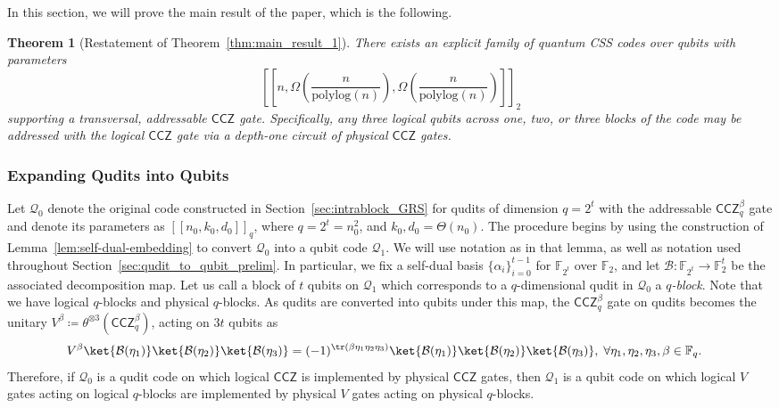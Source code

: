 \documentclass[11pt]{article}
\newtheorem{theorem}{Theorem}[section]
\theoremstyle{definition}
\newcommand{\CCZ}{\mathsf{CCZ}}
\newcommand{\qcode}{\mathcal{Q}}
\newcommand{\FF}{\mathbb{F}}
\newcommand{\B}{\mathcal{B}}
\begin{document}
In this section, we will prove the main result of the paper, which is the following.

\begin{theorem}[Restatement of Theorem~\ref{thm:main_result_1}]\label{thm:main_addressable_CCZ}
    There exists an explicit family of quantum CSS codes over qubits with parameters
    \begin{equation}
        \left[\left[n,\Omega\left(\frac{n}{\text{polylog}(n)}\right),\Omega\left(\frac{n}{\text{polylog}(n)}\right)\right]\right]_2
    \end{equation}
    supporting a transversal, addressable $\CCZ$ gate. Specifically, any three logical qubits across one, two, or three blocks of the code may be addressed with the logical $\CCZ$ gate via a depth-one circuit of physical $\CCZ$ gates.
\end{theorem}


\subsubsection{Expanding Qudits into Qubits}

Let $\qcode_0$ denote the original code constructed in Section~\ref{sec:intrablock_GRS} for qudits of dimension $q=2^t$ with the addressable $\CCZ_q^\beta$ gate and denote its parameters as $[[n_0,k_0,d_0]]_q$, where $q=2^t = n_0^2$, and $k_0,d_0 = \Theta(n_0)$. The procedure begins by using the construction of Lemma~\ref{lem:self-dual-embedding} to convert $\mathcal{Q}_0$ into a qubit code $\mathcal{Q}_1$. We will use notation as in that lemma, as well as notation used throughout Section~\ref{sec:qudit_to_qubit_prelim}. In particular, we fix a self-dual basis $\{\alpha_i\}_{i=0}^{t-1}$ for $\mathbb{F}_{2^t}$ over $\mathbb{F}_2$, and let $\B : \mathbb{F}_{2^t}\to \mathbb{F}_2^t$ be the associated decomposition map. Let us call a block of $t$ qubits on $\qcode_1$ which corresponds to a $q$-dimensional qudit in $\qcode_0$ a \textit{$q$-block}.
Note that we have logical $q$-blocks and physical $q$-blocks.
As qudits are converted into qubits under this map,
the $\CCZ_q^\beta$ gate on qudits becomes the unitary $V^\beta \coloneq \theta^{\otimes 3}\left(\CCZ^\beta_q\right)$, acting on $3t$ qubits as
\begin{align}\label{eq:def_of_V}
     V^\beta \ket{\B(\eta_1)}\ket{\B(\eta_2)}\ket{\B(\eta_3)}
    &= (-1)^{\tr(\beta \eta_1\eta_2\eta_3)}\ket{\B(\eta_1)}\ket{\B(\eta_2)}\ket{\B(\eta_3)},\; \forall \eta_1,\eta_2,\eta_3,\beta\in \FF_q.
\end{align}
Therefore, if $\qcode_0$ is a qudit code on which logical $\CCZ$ is implemented by physical $\CCZ$ gates, then $\qcode_1$ is a qubit code on which logical $V$ gates acting on logical $q$-blocks are implemented by physical $V$ gates acting on physical $q$-blocks. 
\end{document}
